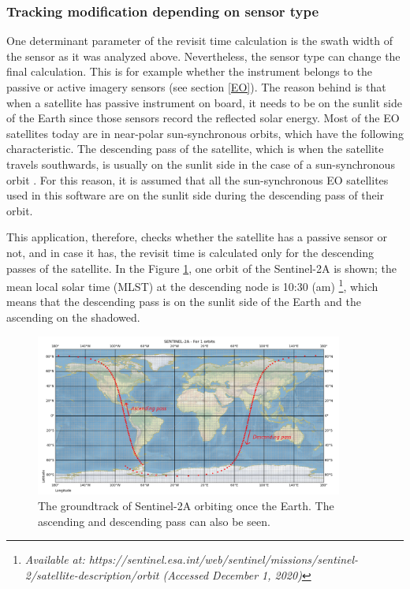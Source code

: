 \bigskip
\subsubsection{Tracking modification depending on sensor type}
\bigskip

One determinant parameter of the revisit time calculation is the swath width of the sensor as it was analyzed above. Nevertheless, the sensor type can change the final calculation. This is for example whether the instrument belongs to the passive or active imagery sensors (see section \ref{EO}). The reason behind is that when a satellite has passive instrument on board, it needs to be on the sunlit side of the Earth since those sensors record the reflected solar energy. Most of the EO satellites today are in near-polar sun-synchronous orbits, which have the following characteristic. The descending pass of the satellite, which is when the satellite travels southwards, is usually on the sunlit side in the case of a sun-synchronous orbit \cite{Kramer 2002}. For this reason, it is assumed that all the sun-synchronous EO satellites used in this software are on the sunlit side during the descending pass of their orbit.

This application, therefore, checks whether the satellite has a passive sensor or not, and in case it has, the revisit time is calculated only for the descending passes of the satellite. In the Figure \ref{ascending-descending}, one orbit of the Sentinel-2A is shown; the mean local solar time (MLST) at the descending node is 10:30 (am) \footnote{\label{MLST_Sentinel2}\textit{Available at: https://sentinel.esa.int/web/sentinel/missions/sentinel-2/satellite-description/orbit (Accessed December 1, 2020)}}, which means that the descending pass is on the sunlit side of the Earth and the ascending on the shadowed.

\begin{figure}
\centering
\includegraphics[width=0.9\textwidth]{Images/ascending-descending.png}\caption{The groundtrack of Sentinel-2A orbiting once the Earth. The ascending and descending pass can also be seen.}
\label{ascending-descending}
\end{figure}

